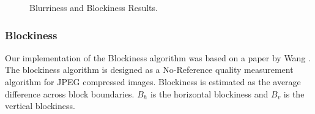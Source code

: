 \begin{figure} [H]
	\centering
	\caption{Blurriness and Blockiness Results.} \label{fig:BlurrBlockExp}	
\end{figure}

\subsubsection{Blockiness}

Our implementation of the Blockiness algorithm was based on a paper by Wang \cite{Wang}.  
The blockiness algorithm is designed as a No-Reference quality measurement algorithm for JPEG compressed images.  
Blockiness is estimated as the average difference across block boundaries.  
$B_{h}$ is the horizontal blockiness and $B_{v}$ is the vertical blockiness.

